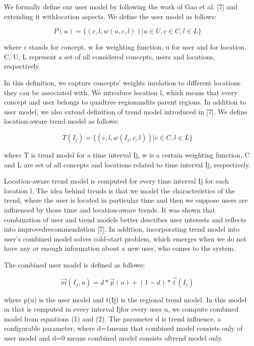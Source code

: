 \documentclass[a4, conference]{IEEEtran}
\begin{document}
 We  formally  define  our  user  model  by  following  the work of Gao et al. [7] and extending it withlocation aspects. We define the user model as follows: 

\begin{equation}
P(u)=\{(c,l,w(u,c,l))|u\in U, c\in C, l\in L\}
\end{equation}

where c  stands  for  concept, w for  weighting  function, u for user  and  for  location. C, U, L  represent  a  set  of  all considered concepts, users and locations, respectively. 

In   this   definition,   we   capture   concepts’   weights   inrelation  to  different  locations  they  can  be  associated  with. We introduce location l, which means that every concept and user belongs to quadtree regionandits parent regions. In  addition  to  user  model,  we  also  extend  definition  of trend  model  introduced  in  [7].  We  define  location-aware trend model as follows: 

\begin{equation}
T(I_{j})=\{(c,l,w(I_{j},c,l))|c\in C, l\in L\}
\end{equation}

where T  is  trend  model  for  a  time  interval Ij, w  is  a  certain weighting  function, C  and L  are  set  of  all  concepts  and locations related to time interval Ij, respectively.

 Location-aware  trend  model  is  computed  for  every  time interval Ij for  each  location l. The  idea  behind  trends  is  that we  model  the  characteristics  of  the  trend,  where  the  user  is located  in  particular  time and  then  we  suppose  users  are influenced  by  those  time  and  location-aware  trends.  It  was shown  that  combination  of  user  and  trend  models  better describes    user    interests    and    reflects    into    improvedrecommendation  [7].  In  addition,  incorporating  trend  model into user’s combined model solves cold-start problem, which emerges  when  we  do  not  have  any  or enough  information about a new user, who comes to the system.

 The combined user model is defined as follows: 

\begin{equation}
\overrightarrow{m}(I_{j},u)=d*\overrightarrow{p}(u)+(1-d)*\overrightarrow{t}(I_{j})
\end{equation}

where p(u)  is  the  user  model  and t(Ij)  is  the  regional  trend model.  In  this  model m  that  is  computed  in  every  interval Ijfor   every   user u, we   compute   combined   model   from equations  (1)  and  (2).  The  parameter d  is  trend  influence,  a configurable  parameter,  where d=1means  that  combined model consists only of user model and d=0 means combined model consists oftrend model only.
\end{document}
